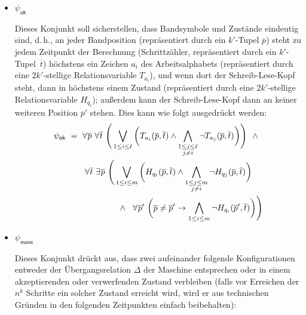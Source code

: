 \documentclass[fontsize=11pt, twoside=false, numbers=autoenddot]{scrbook}
\begin{document}
\begin{itemize}
  \item
    {\boldmath $\psi_{\textsf{ok}}$}
    \par
    Dieses Konjunkt soll sicherstellen,
    dass Bandsymbole und Zustände eindeutig sind, d.\,h.,
    an jeder Bandposition (repräsentiert durch ein $k'$-Tupel $\overline{p}$)
    steht zu jedem Zeitpunkt der Berechnung
    (Schrittzähler, repräsentiert durch ein $k'$-Tupel~$\overline{t}$)
    höchstens ein Zeichen $a_i$ des Arbeitsalphabets
    (repräsentiert durch eine $2k'$-stellige Relationsvariable $T_{a_i}$),
    und wenn dort der Schreib-Lese-Kopf steht,
    dann in höchstens einem Zustand
    (repräsentiert durch eine $2k'$-stellige Relationsvariable $H_{q_i}$);
    außerdem kann der Schreib-Lese-Kopf dann an keiner weiteren Position $\overline{p}'$ stehen.
    Dies kann wie folgt ausgedrückt werden:
    \begin{align*}
      \psi_{\textsf{ok}} & ~=~
      \forall\:\! \overline{p}~\forall\:\! \overline{t}~
      \Bigg(
        \bigvee_{1 \leq i \leq \ell} \bigg(
          T_{a_i}(\overline{p},\overline{t}) \land
          \bigwedge_{\substack{1 \leq j \leq \ell\\j \neq i}} \lnot T_{a_j}(\overline{p},\overline{t})
        \bigg)
      \Bigg)
      ~~\land \\
      & \hspace*{8mm}
      \forall\:\! \overline{t}~\exists\:\! \overline{p}~
      \Bigg(
        \bigvee_{1 \leq i \leq m} \bigg(
          H_{q_i}(\overline{p},\overline{t}) \land
          \bigwedge_{\substack{1 \leq j \leq m\\j \neq i}} \lnot H_{q_j}(\overline{p},\overline{t})
        \bigg)
      \\
      & \hspace*{22mm}
      \land~~ \forall\:\! \overline{p}'~
      \bigg(
        \overline{p} \neq \overline{p}' \to
        \bigwedge_{1 \leq i \leq m} \lnot H_{q_i}(\overline{p}',\overline{t})
      \bigg)\Bigg)
    \end{align*}
  \item
    {\boldmath $\psi_{\textsf{move}}$}
    \par
    Dieses Konjunkt drückt aus, dass zwei aufeinander folgende Konfigurationen
    entweder der Übergangsrelation $\Delta$ der Maschine entsprechen
    oder in einem akzeptierenden oder verwerfenden Zustand verbleiben
    (falls vor Erreichen der $n^k$ Schritte ein solcher Zustand erreicht wird,
    wird er aus technischen Gründen in den folgenden Zeitpunkten einfach beibehalten):

\end{itemize}
\end{document}
